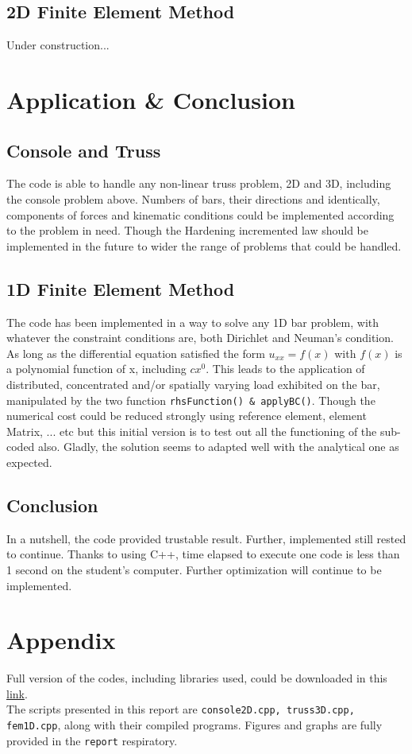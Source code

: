\documentclass[a4paper,12pt]{article}
\numberwithin{equation}{section}
\theoremstyle{remark}
\begin{document}
\subsection{2D Finite Element Method}
Under construction...
\section{Application \& Conclusion}
\subsection{Console and Truss}
The code is able to handle any non-linear truss problem, 2D and 3D, including the console problem above. Numbers of bars, their directions and identically, components of forces and kinematic conditions could be implemented according to the problem in need.
Though the Hardening incremented law should be implemented in the future to wider the range of problems that could be handled.
\subsection{1D Finite Element Method}
The code has been implemented in a way to solve any 1D bar problem, with whatever the constraint conditions are, both Dirichlet and Neuman's condition. As long as the differential equation satisfied the form $u_{xx} = f(x)$ with $f(x)$ is a polynomial function of x, including $cx^0$.
This leads to the application of distributed, concentrated and/or spatially varying load exhibited on the bar, manipulated by the two function \texttt{rhsFunction() \& applyBC()}.
Though the numerical cost could be reduced strongly using reference element, element Matrix, ... etc but this initial version is to test out all the functioning of the sub-coded also. Gladly, the solution seems to adapted well with the analytical one as expected.
\subsection{Conclusion}
In a nutshell, the code provided trustable result. Further, implemented still rested to continue.
Thanks to using C++, time elapsed to execute one code is less than 1 second on the student's computer.
Further optimization will continue to be implemented.
\pagebreak
\appendix
\section{Appendix}\label{Appendix}
Full version of the codes, including libraries used, could be downloaded in this \href{https://github.com/VA-TT/Numerical-Method-3SR}{link}.\\
The scripts presented in this report are \texttt{console2D.cpp, truss3D.cpp, fem1D.cpp}, along with their compiled programs.
Figures and graphs are fully provided in the \texttt{report} respiratory.



\end{document}
